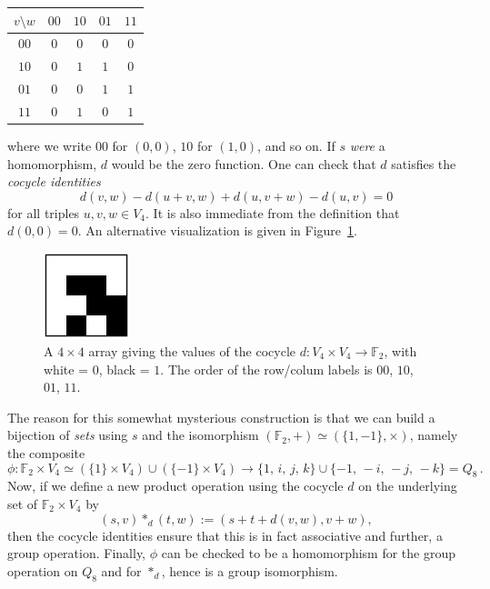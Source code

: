 \documentclass{article}
\theoremstyle{plain}
\theoremstyle{definition}
\def \FF {\mathbb{F}}
\begin{document}
\begin{center}
\begin{tabular*}{0.35\textwidth}{c|cccc}
$v\setminus w$&$00$&$10$&$01$&$11$\\
\hline
	$00$		& $0$& $0$& $0$& $0$\\
	$10$		& $0$& $1$& $1$& $0$\\
	$01$		& $0$& $0$& $1$& $1$\\
	$11$		& $0$& $1$& $0$& $1$\\
\end{tabular*}
\end{center}
where we write $00$ for $(0,0)$, $10$ for $(1,0)$, and so on.
If $s$ \emph{were} a homomorphism, $d$ would be the zero function.
One can check that $d$ satisfies the \emph{cocycle identities}
\[
	d(v,w)-d(u+v,w)+d(u,v+w)-d(u,v) = 0
\]
for all triples $u,v,w\in V_4$. 
It is also immediate from the definition that $d(0,0)=0$.
An alternative visualization is given in Figure~\ref{fig:cocycle for q8}.

\begin{figure}[!ht]
\begin{center}
\includegraphics[height=2.5cm]{quaternion_cocyc} %
\end{center}
\caption{A $4\times4$ array giving the values of the cocycle $d\colon V_4\times V_4\to \FF_2$, with white = $0$, black = $1$. The order of the row/colum labels is $00$, $10$, $01$, $11$.}
\label{fig:cocycle for q8}
\end{figure}


The reason for this somewhat mysterious construction is that we can build a bijection of \emph{sets} using $s$ and the isomorphism $(\FF_2,+)\simeq (\{1,-1\},\times)$, namely the composite
\[
	\phi\colon \FF_2\times V_4 \simeq \left(\{1\}\times V_4\right) \cup \left(\{-1\} \times V_4\right) \longrightarrow
	\{1,\, i,\, j,\, k\}\cup \{-1,\, -i,\, -j,\, -k\} = Q_8\,.
\]
Now, if we define a new product operation using the cocycle $d$ on the underlying set of $\FF_2\times V_4$ by
\[
	(s,v)\ast_d(t,w):=(s+ t+ d(v,w),v+w),
\]
then the cocycle identities ensure that this is in fact associative and further, a group operation.
Finally, $\phi$ can be checked to be a homomorphism for the group operation on $Q_8$ and for $\ast_d$, hence is a group isomorphism.
\end{document}

